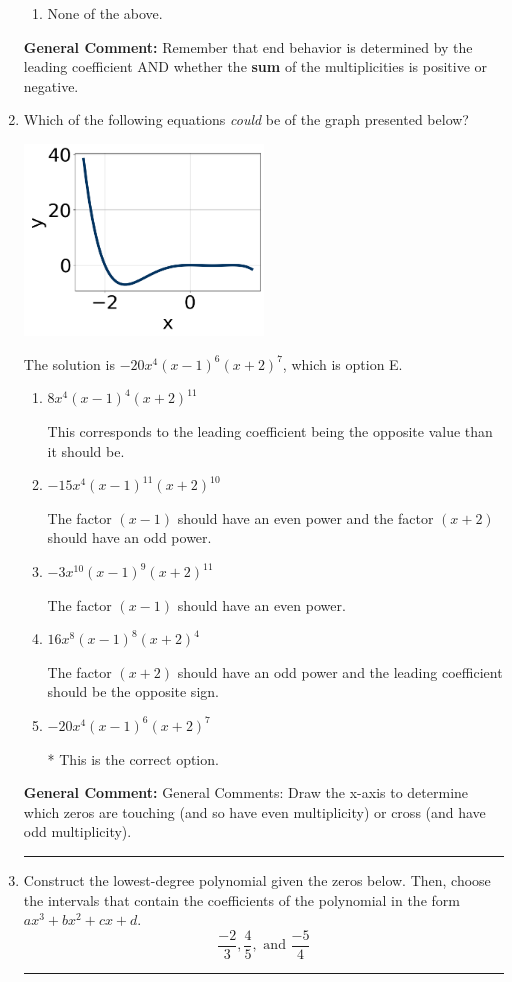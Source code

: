 \documentclass{extbook}[14pt]
\newcommand{\litem}[1]{\item #1

\rule{\textwidth}{0.4pt}}
\begin{document}
\begin{enumerate}
{\begin{enumerate}[label=\Alph*.]
\begin{multicols}{2}
\end{multicols}\item None of the above.\end{enumerate}
\textbf{General Comment:} Remember that end behavior is determined by the leading coefficient AND whether the \textbf{sum} of the multiplicities is positive or negative.
}
\litem{
Which of the following equations \textit{could} be of the graph presented below?

\begin{center}
    \includegraphics[width=0.5\textwidth]{../Figures/polyGraphToFunctionCopyA.png}
\end{center}




The solution is \( -20x^{4} (x - 1)^{6} (x + 2)^{7} \), which is option E.\begin{enumerate}[label=\Alph*.]
\item \( 8x^{4} (x - 1)^{4} (x + 2)^{11} \)

This corresponds to the leading coefficient being the opposite value than it should be.
\item \( -15x^{4} (x - 1)^{11} (x + 2)^{10} \)

The factor $(x - 1)$ should have an even power and the factor $(x + 2)$ should have an odd power.
\item \( -3x^{10} (x - 1)^{9} (x + 2)^{11} \)

The factor $(x - 1)$ should have an even power.
\item \( 16x^{8} (x - 1)^{8} (x + 2)^{4} \)

The factor $(x + 2)$ should have an odd power and the leading coefficient should be the opposite sign.
\item \( -20x^{4} (x - 1)^{6} (x + 2)^{7} \)

* This is the correct option.
\end{enumerate}

\textbf{General Comment:} General Comments: Draw the x-axis to determine which zeros are touching (and so have even multiplicity) or cross (and have odd multiplicity).
}
\litem{
Construct the lowest-degree polynomial given the zeros below. Then, choose the intervals that contain the coefficients of the polynomial in the form $ax^3+bx^2+cx+d$.
\[ \frac{-2}{3}, \frac{4}{5}, \text{ and } \frac{-5}{4} \]

}
\end{enumerate}
\end{document}
